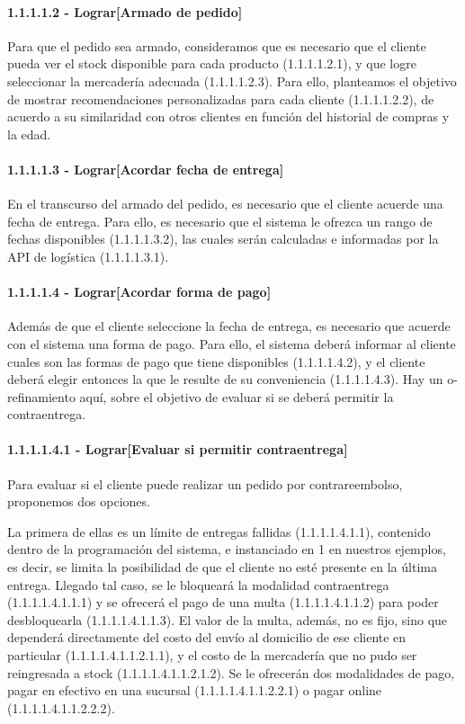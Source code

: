 \paragraph{1.1.1.1.2 - Lograr[Armado de pedido]} \label{para:1.1.1.1.2}

Para que el pedido sea armado, consideramos que es necesario que el cliente
pueda ver el stock disponible para cada producto (1.1.1.1.2.1), y que logre
seleccionar la mercadería adecuada (1.1.1.1.2.3). Para ello, planteamos el
objetivo de mostrar recomendaciones personalizadas para cada cliente
(1.1.1.1.2.2), de acuerdo a su similaridad con otros clientes en función del
historial de compras y la edad.

\paragraph{1.1.1.1.3 - Lograr[Acordar fecha de entrega]} \label{para:1.1.1.1.3}

En el transcurso del armado del pedido, es necesario que el cliente acuerde una
fecha de entrega. Para ello, es necesario que el sistema le ofrezca un rango de
fechas disponibles (1.1.1.1.3.2), las cuales serán calculadas e informadas por
la API de logística (1.1.1.1.3.1).

\paragraph{1.1.1.1.4 - Lograr[Acordar forma de pago]} \label{para:1.1.1.1.4}

Además de que el cliente seleccione la fecha de entrega, es necesario que
acuerde con el sistema una forma de pago. Para ello, el sistema deberá informar
al cliente cuales son las formas de pago que tiene disponibles (1.1.1.1.4.2), y
el cliente deberá elegir entonces la que le resulte de su conveniencia
(1.1.1.1.4.3). Hay un o-refinamiento aquí, sobre el objetivo de evaluar si se
deberá permitir la contraentrega.

\paragraph{1.1.1.1.4.1 - Lograr[Evaluar si permitir contraentrega]} \label{para:1.1.1.1.4.1}

Para evaluar si el cliente puede realizar un pedido por contrareembolso,
proponemos dos opciones.

La primera de ellas es un límite de entregas fallidas (1.1.1.1.4.1.1), contenido
dentro de la programación del sistema, e instanciado en 1 en nuestros ejemplos,
es decir, se limita la posibilidad de que el cliente no esté presente en la
última entrega. Llegado tal caso, se le bloqueará la modalidad contraentrega
(1.1.1.1.4.1.1.1) y se ofrecerá el pago de una multa (1.1.1.1.4.1.1.2) para
poder desbloquearla (1.1.1.1.4.1.1.3). El valor de la multa, además, no es fijo,
sino que dependerá directamente del costo del envío al domicilio de ese cliente
en particular (1.1.1.1.4.1.1.2.1.1), y el costo de la mercadería que no pudo ser
reingresada a stock (1.1.1.1.4.1.1.2.1.2). Se le ofrecerán dos modalidades de
pago, pagar en efectivo en una sucursal
(1.1.1.1.4.1.1.2.2.1) o pagar online (1.1.1.1.4.1.1.2.2.2).

